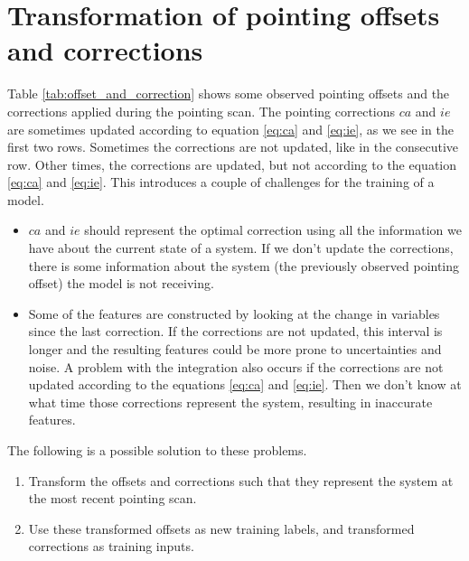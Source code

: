 \section{Transformation of pointing offsets and corrections}
Table \ref{tab:offset_and_correction} shows some observed pointing offsets and the corrections applied during the pointing scan.
The pointing corrections $ca$ and $ie$ are sometimes updated according to equation \eqref{eq:ca} and \eqref{eq:ie},
as we see in the first two rows. Sometimes the corrections are not updated, like in the consecutive row. Other times, the corrections are updated, but not according to the equation \eqref{eq:ca} and \eqref{eq:ie}.
This introduces a couple of challenges for the training of a model.
\begin{itemize}
    \item $ca$ and $ie$ should represent the optimal correction using all the information we have about the current state of a system.
    If we don't update the corrections, there is some information about the system (the previously observed pointing offset) the model is not receiving.
    \item Some of the features are constructed by looking at the change in variables since the last correction.
    If the corrections are not updated, this interval is longer and the resulting features could be more prone to uncertainties and noise.
    A problem with the integration also occurs if the corrections are not updated according to the equations \eqref{eq:ca} and \eqref{eq:ie}.
    Then we don't know at what time those corrections represent the system, resulting in inaccurate features.
\end{itemize}


The following is a possible solution to these problems.
\begin{enumerate}
    \item Transform the offsets and corrections such that they represent the system at the most recent pointing scan.
    \item Use these transformed offsets as new training labels, and transformed corrections as training inputs.
\end{enumerate}


